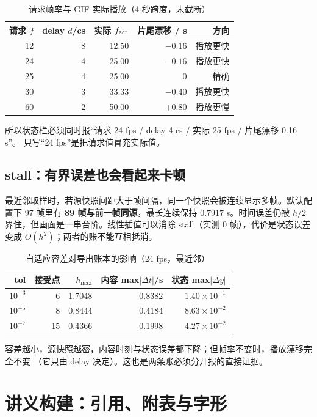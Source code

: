 \begin{table}[htbp]
\centering
\caption{请求帧率与 GIF 实际播放（4 秒跨度，未截断）}
\begin{tabular}{rrrrr}
\toprule
请求 $f$ & delay $d$/cs & 实际 $f_{\rm act}$ & 片尾漂移 / s & 方向 \\
\midrule
12 & 8 & 12.50 & $-0.16$ & 播放更快 \\
24 & 4 & 25.00 & $-0.16$ & 播放更快 \\
25 & 4 & 25.00 & $0$ & 精确 \\
30 & 3 & 33.33 & $-0.40$ & 播放更快 \\
60 & 2 & 50.00 & $+0.80$ & 播放更慢 \\
\bottomrule
\end{tabular}
\end{table}

所以状态栏必须同时报“请求 24 fps / delay 4 cs / 实际 25 fps / 片尾漂移 0.16 s”。
只写“24 fps”是把请求值冒充实际值。

\subsection{stall：有界误差也会看起来卡顿}

最近邻取样时，若源快照间距大于帧间隔，同一个快照会被连续显示多帧。默认配置下
97 帧里有 \textbf{89 帧与前一帧同源}，最长连续保持 $0.7917$ s。时间误差仍被
$h/2$ 界住，但画面是一串台阶。线性插值可以消除 stall（实测 0 帧），代价是状态误差
变成 $O(h^2)$；两者的账不能互相抵消。

\begin{table}[htbp]
\centering
\caption{自适应容差对导出账本的影响（24 fps，最近邻）}
\begin{tabular}{rrrrr}
\toprule
tol & 接受点 & $h_{\max}$ & 内容 max$|\Delta t|$/s & 状态 max$|\Delta y|$ \\
\midrule
$10^{-3}$ & 6 & 1.7048 & 0.8382 & $1.40\times10^{-1}$ \\
$10^{-5}$ & 8 & 0.8444 & 0.4184 & $8.63\times10^{-2}$ \\
$10^{-7}$ & 15 & 0.4366 & 0.1998 & $4.27\times10^{-2}$ \\
\bottomrule
\end{tabular}
\end{table}

容差越小，源快照越密，内容时刻与状态误差都下降；但帧率不变时，播放漂移完全不变
（它只由 delay 决定）。这也是两条账必须分开报的直接证据。

\section{讲义构建：引用、附表与字形}\label{sec:book}

